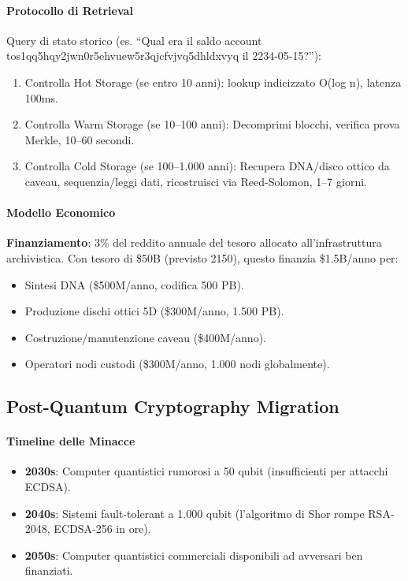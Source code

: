 \documentclass[11pt]{article}
\begin{document}
\paragraph{Protocollo di Retrieval}
Query di stato storico (es. ``Qual era il saldo account tos1qq5hqy2jwn0r5ehvuew5r3qjcfvjvq5dhldxvyq il 2234-05-15?''):
\begin{enumerate}[noitemsep]
  \item Controlla Hot Storage (se entro 10 anni): lookup indicizzato O(log n), latenza 100ms.
  \item Controlla Warm Storage (se 10--100 anni): Decomprimi blocchi, verifica prova Merkle, 10--60 secondi.
  \item Controlla Cold Storage (se 100--1.000 anni): Recupera DNA/disco ottico da caveau, sequenzia/leggi dati, ricostruisci via Reed-Solomon, 1--7 giorni.
\end{enumerate}

\paragraph{Modello Economico}
\textbf{Finanziamento}: 3\% del reddito annuale del tesoro allocato all'infrastruttura archivistica. Con tesoro di \$50B (previsto 2150), questo finanzia \$1.5B/anno per:
\begin{itemize}[noitemsep]
  \item Sintesi DNA (\$500M/anno, codifica 500 PB).
  \item Produzione dischi ottici 5D (\$300M/anno, 1.500 PB).
  \item Costruzione/manutenzione caveau (\$400M/anno).
  \item Operatori nodi custodi (\$300M/anno, 1.000 nodi globalmente).
\end{itemize}

\subsection{Post-Quantum Cryptography Migration}

\paragraph{Timeline delle Minacce}
\begin{itemize}[noitemsep]
  \item \textbf{2030s}: Computer quantistici rumorosi a 50 qubit (insufficienti per attacchi ECDSA).
  \item \textbf{2040s}: Sistemi fault-tolerant a 1.000 qubit (l'algoritmo di Shor rompe RSA-2048, ECDSA-256 in ore).
  \item \textbf{2050s}: Computer quantistici commerciali disponibili ad avversari ben finanziati.
\end{itemize}
\end{document}
